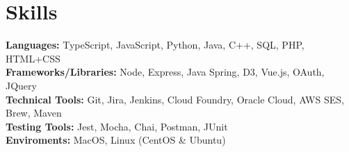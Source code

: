 \documentclass[letterpaper,11pt]{article}
\begin{document}
\section{Skills}
 \begin{itemize}[leftmargin=0.15in, label={}]
    \small{\item{
     \textbf{Languages: }{ TypeScript, JavaScript, Python, Java, C++, SQL, PHP, HTML+CSS} \\
     \textbf{Frameworks/Libraries: }{Node, Express, Java Spring, D3, Vue.js, OAuth, JQuery} \\
     \textbf{Technical Tools: } {Git, Jira, Jenkins, Cloud Foundry, Oracle Cloud, AWS SES, Brew, Maven} \\
     \textbf{Testing Tools: }{Jest, Mocha, Chai, Postman, JUnit} \\
     \textbf{Enviroments: }{MacOS, Linux (CentOS \& Ubuntu)} \\
    }}
 \end{itemize}
\end{document}
